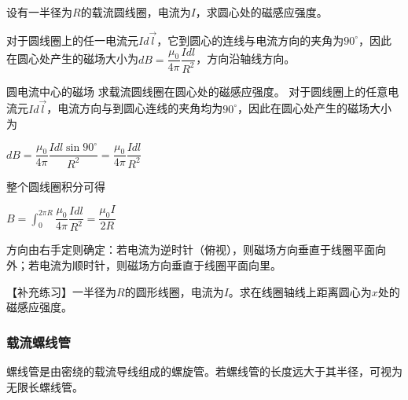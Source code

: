 设有一半径为$R$的载流圆线圈，电流为$I$，求圆心处的磁感应强度。

对于圆线圈上的任一电流元$Id\vec{l}$，它到圆心的连线与电流方向的夹角为$90^\circ$，因此在圆心处产生的磁场大小为$dB=\dfrac{\mu_0}{4\pi}\dfrac{Idl}{R^2}$，方向沿轴线方向。

\begin{example}{圆电流中心的磁场}
    求载流圆线圈在圆心处的磁感应强度。
    \tcblower
    对于圆线圈上的任意电流元$Id\vec{l}$，电流方向与到圆心连线的夹角均为$90^\circ$，因此在圆心处产生的磁场大小为

    $dB=\dfrac{\mu_0}{4\pi}\dfrac{Idl\sin90^\circ}{R^2}=\dfrac{\mu_0}{4\pi}\dfrac{Idl}{R^2}$

    整个圆线圈积分可得

    $B=\displaystyle\int_0^{2\pi R}{\dfrac{\mu_0}{4\pi}\dfrac{Idl}{R^2}}=\dfrac{\mu_0 I}{2R}$

    方向由右手定则确定：若电流为逆时针（俯视），则磁场方向垂直于线圈平面向外；若电流为顺时针，则磁场方向垂直于线圈平面向里。

    \tcbline
    【补充练习】一半径为$R$的圆形线圈，电流为$I$。求在线圈轴线上距离圆心为$x$处的磁感应强度。
\end{example}


\subsubsection{载流螺线管}

螺线管是由密绕的载流导线组成的螺旋管。若螺线管的长度远大于其半径，可视为无限长螺线管。

